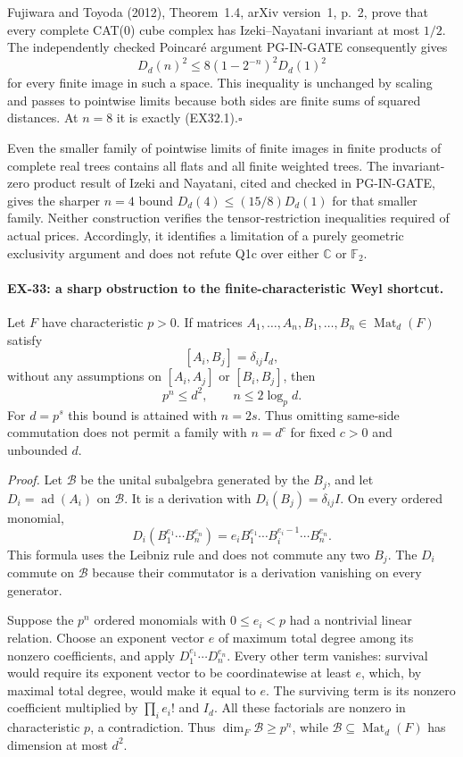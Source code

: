 Fujiwara and Toyoda (2012), Theorem~1.4, arXiv version~1,
p.~2, prove that every complete CAT(0) cube complex has
Izeki--Nayatani invariant at most $1/2$. The independently
checked Poincar\'e argument PG-IN-GATE consequently gives
\[
 D_d(n)^2\le8(1-2^{-n})^2D_d(1)^2
\]
for every finite image in such a space. This inequality is
unchanged by scaling and passes to pointwise limits because
both sides are finite sums of squared distances. At $n=8$
it is exactly (EX32.1).\hfill$\square$

Even the smaller family of pointwise limits of finite images
in finite products of complete real trees contains all flats
and all finite weighted trees. The invariant-zero product
result of Izeki and Nayatani, cited and checked in PG-IN-GATE,
gives the sharper $n=4$ bound $D_d(4)\le(15/8)D_d(1)$
for that smaller family. Neither construction verifies the
tensor-restriction inequalities required of actual prices.
Accordingly, it identifies a limitation of a purely geometric
exclusivity argument and does not refute Q1c over either
$\mathbb C$ or $\mathbb F_2$.

\paragraph{EX-33: a sharp obstruction to the finite-characteristic Weyl shortcut.}
Let $F$ have characteristic $p>0$. If matrices
$A_1,\ldots,A_n,B_1,\ldots,B_n\in\operatorname{Mat}_d(F)$
satisfy
\[
 [A_i,B_j]=\delta_{ij}I_d,
\]
without any assumptions on $[A_i,A_j]$ or $[B_i,B_j]$, then
\[
 p^n\le d^2,\qquad n\le2\log_p d.
 \tag{EX33.1}
\]
For $d=p^s$ this bound is attained with $n=2s$.
Thus omitting same-side commutation does not permit a family
with $n=d^c$ for fixed $c>0$ and unbounded $d$.

\emph{Proof.}
Let $\mathcal B$ be the unital subalgebra generated by the
$B_j$, and let $D_i=\operatorname{ad}(A_i)$ on
$\mathcal B$. It is a derivation with
$D_i(B_j)=\delta_{ij}I$. On every ordered monomial,
\[
 D_i(B_1^{e_1}\cdots B_n^{e_n})
   =e_i B_1^{e_1}\cdots B_i^{e_i-1}\cdots B_n^{e_n}.
\]
This formula uses the Leibniz rule and does not commute
any two $B_j$. The $D_i$ commute on $\mathcal B$ because
their commutator is a derivation vanishing on every generator.

Suppose the $p^n$ ordered monomials with $0\le e_i<p$
had a nontrivial linear relation. Choose an exponent vector
$e$ of maximum total degree among its nonzero coefficients,
and apply $D_1^{e_1}\cdots D_n^{e_n}$.
Every other term vanishes: survival would require its
exponent vector to be coordinatewise at least $e$, which,
by maximal total degree, would make it equal to $e$.
The surviving term is its nonzero coefficient multiplied
by $\prod_i e_i!$ and $I_d$. All these factorials are
nonzero in characteristic $p$, a contradiction.
Thus $\dim_F\mathcal B\ge p^n$, while
$\mathcal B\subseteq\operatorname{Mat}_d(F)$ has dimension
at most $d^2$.

